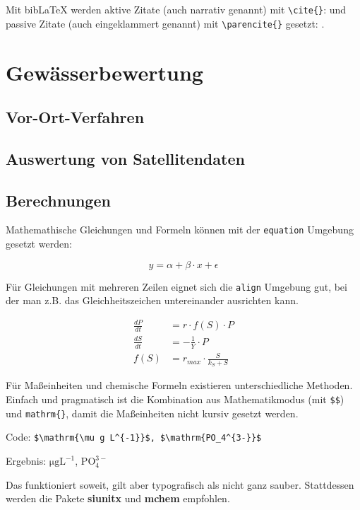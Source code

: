 \documentclass[fontsize=12pt,BCOR=12mm,logo/language=de]{tudcdreprt}
\begin{document}
Mit bibLaTeX werden aktive Zitate (auch narrativ genannt) mit \texttt{\textbackslash cite\{\}}: \cite{r-core-2024} und passive Zitate (auch eingeklammert genannt) mit \texttt{\textbackslash parencite\{\}} gesetzt: \parencite{r-core-2024}.

\section{Gewässerbewertung}

\subsection{Vor-Ort-Verfahren}

\subsection{Auswertung von Satellitendaten}

\subsection{Berechnungen}

Mathemathische Gleichungen und Formeln können mit der \texttt{equation} Umgebung gesetzt werden:

\begin{equation}
	y = \alpha + \beta \cdot x + \epsilon
\end{equation}

Für Gleichungen mit mehreren Zeilen eignet sich die \texttt{align} Umgebung gut, bei der man z.B. das Gleichheitszeichen untereinander ausrichten kann.

\begin{align}
\frac{dP}{dt} &= r \cdot f(S) \cdot P \\
\frac{dS}{dt} &= - \frac{1}{Y} \cdot P \\
f(S) &= r_{max} \cdot \frac{S}{k_S + S}
\end{align}

Für Maßeinheiten und chemische Formeln existieren unterschiedliche Methoden. Einfach und pragmatisch ist die Kombination aus Mathematikmodus (mit \verb#$$#) und \verb#mathrm{}#, damit die Maßeinheiten nicht kursiv gesetzt werden.


Code: \verb#$\mathrm{\mu g L^{-1}}$, $\mathrm{PO_4^{3-}}$#

Ergebnis: $\mathrm{\mu g L^{-1}}$, $\mathrm{PO_4^{3-}}$

Das funktioniert soweit, gilt aber typografisch als nicht ganz sauber. Stattdessen werden die Pakete
\textbf{siunitx} und \textbf{mchem} empfohlen.
\end{document}
